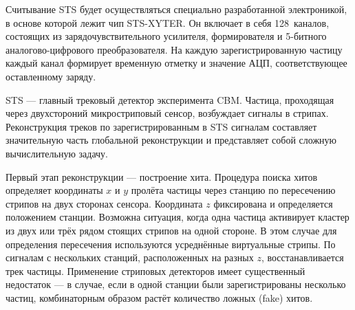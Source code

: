 Считывание STS будет осуществляться специально разработанной электроникой, в основе которой лежит чип STS-XYTER. Он включает в себя 128~каналов, состоящих из зарядочувствительного усилителя, формирователя и 5-битного аналогово-цифрового преобразователя. На каждую зарегистрированную частицу каждый канал формирует временную отметку и значение АЦП, соответствующее оставленному заряду.





STS --- главный трековый детектор эксперимента CBM. Частица, проходящая через двухстороний микростриповый сенсор, возбуждает сигналы в стрипах. Реконструкция треков по зарегистрированным в STS сигналам составляет значительную часть глобальной реконструкции и представляет собой сложную вычислительную задачу.

Первый этап реконструкции --- построение хита. Процедура поиска хитов определяет координаты $x$ и $y$ пролёта частицы через станцию по пересечению стрипов на двух сторонах сенсора. Координата $z$ фиксирована и определяется положением станции. Возможна ситуация, когда одна частица активирует кластер из двух или трёх рядом стоящих стрипов на одной стороне. В этом случае для определения пересечения используются усреднённые виртуальные стрипы. По сигналам с нескольких станций, расположенных на разных $z$, восстанавливается трек частицы. Применение стриповых детекторов имеет существенный недостаток --- в случае, если в одной станции были зарегистрированы несколько частиц, комбинаторным образом растёт количество ложных (fake) хитов.%

